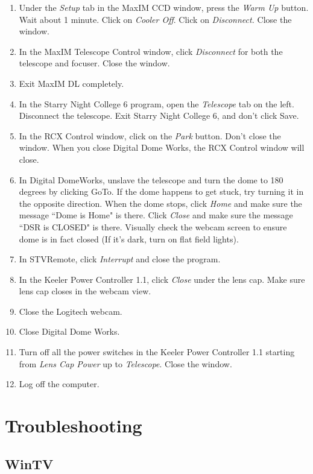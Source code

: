 \documentclass[11pt]{report}
\begin{document}
\begin{enumerate}
\item Under the \emph{Setup} tab in the MaxIM CCD window, press the \emph{Warm Up} button. Wait about 1 minute. Click on \emph{Cooler Off}. Click on \emph{Disconnect.} Close the window.
\item In the MaxIM Telescope Control window, click \emph{Disconnect} for both the telescope and focuser. Close the window.
\item Exit MaxIM DL completely.
\item In the Starry Night College 6 program, open the \emph{Telescope} tab on the left. Disconnect the telescope. Exit Starry Night College 6, and don't click Save.
\item In the RCX Control window, click on the \emph{Park} button. Don't close the window. When you close Digital Dome Works, the RCX Control window will close.
\item In Digital DomeWorks, unslave the telescope and turn the dome to 180 degrees by clicking GoTo. If the dome happens to get stuck, try turning it in the opposite direction. When the dome stops, click \emph{Home} and make sure the message ``Dome is Home" is there. Click \emph{Close} and make sure the message ``DSR is CLOSED" is there. Visually check the webcam screen to ensure dome is in fact closed (If it's dark, turn on flat field lights).
\item In STVRemote, click \emph{Interrupt} and close the program.
\item In the Keeler Power Controller 1.1, click \emph{Close} under the lens cap. Make sure lens cap closes in the webcam view.
\item Close the Logitech webcam.
\item Close Digital Dome Works.
\item Turn off all the power switches in the Keeler Power Controller 1.1 starting from \emph{Lens Cap Power} up to \emph{Telescope}. Close the window. 
\item Log off the computer.
\end{enumerate}

\chapter{Troubleshooting}

\section{WinTV}
\end{document}
